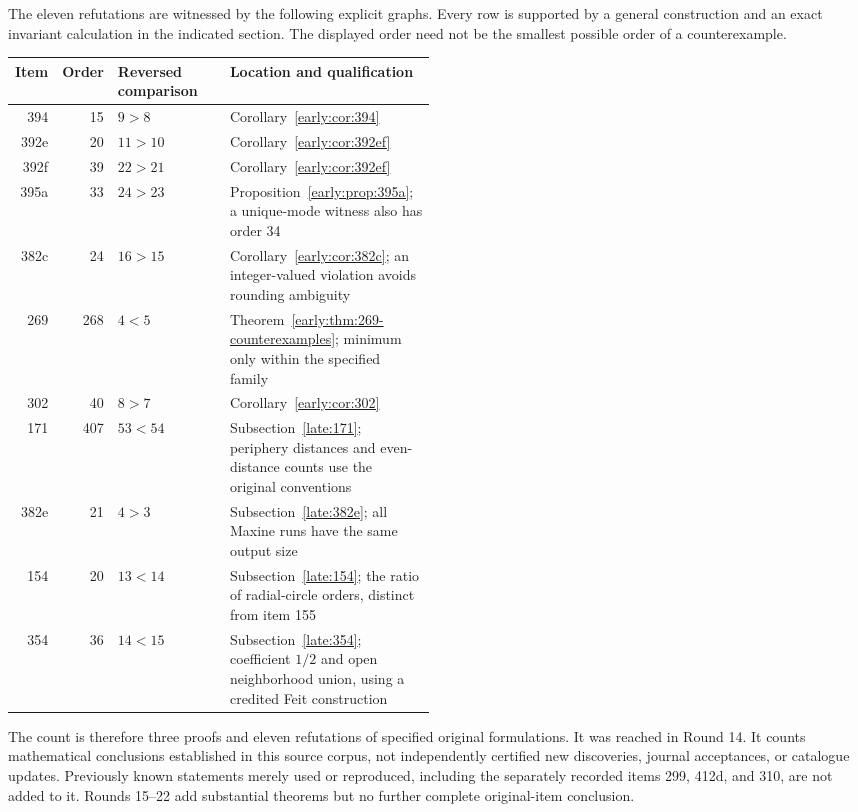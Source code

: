 \documentclass[11pt,a4paper]{article}
\theoremstyle{definition}\newtheorem{definition}[theorem]{Definition}
\theoremstyle{remark}\newtheorem{remark}[theorem]{Remark}
\begin{document}
The eleven refutations are witnessed by the following explicit graphs.
Every row is supported by a general construction and an exact invariant
calculation in the indicated section. The displayed order need not be
the smallest possible order of a counterexample.
\begin{center}
\begin{tabular}{rrlp{0.49\linewidth}}
\toprule
Item&Order&Reversed comparison&Location and qualification\\\midrule
394&15&$9>8$&Corollary~\ref{early:cor:394}\\
392e&20&$11>10$&Corollary~\ref{early:cor:392ef}\\
392f&39&$22>21$&Corollary~\ref{early:cor:392ef}\\
395a&33&$24>23$&Proposition~\ref{early:prop:395a}; a unique-mode
witness also has order 34\\
382c&24&$16>15$&Corollary~\ref{early:cor:382c}; an integer-valued
violation avoids rounding ambiguity\\
269&268&$4<5$&Theorem~\ref{early:thm:269-counterexamples}; minimum
only within the specified family\\
302&40&$8>7$&Corollary~\ref{early:cor:302}\\
171&407&$53<54$&Subsection~\ref{late:171}; periphery distances and
even-distance counts use the original conventions\\
382e&21&$4>3$&Subsection~\ref{late:382e}; all Maxine runs have the
same output size\\
154&20&$13<14$&Subsection~\ref{late:154}; the ratio of radial-circle
orders, distinct from item 155\\
354&36&$14<15$&Subsection~\ref{late:354}; coefficient $1/2$ and open
neighborhood union, using a credited Feit construction\\\bottomrule
\end{tabular}
\end{center}
The count is therefore three proofs and eleven refutations of specified
original formulations. It was reached in Round 14. It counts mathematical
conclusions established in this source corpus, not independently certified
new discoveries, journal acceptances, or catalogue updates. Previously
known statements merely used or reproduced, including the separately
recorded items 299, 412d, and 310, are not added to it. Rounds 15--22
add substantial theorems but no further complete original-item conclusion.
\end{document}
